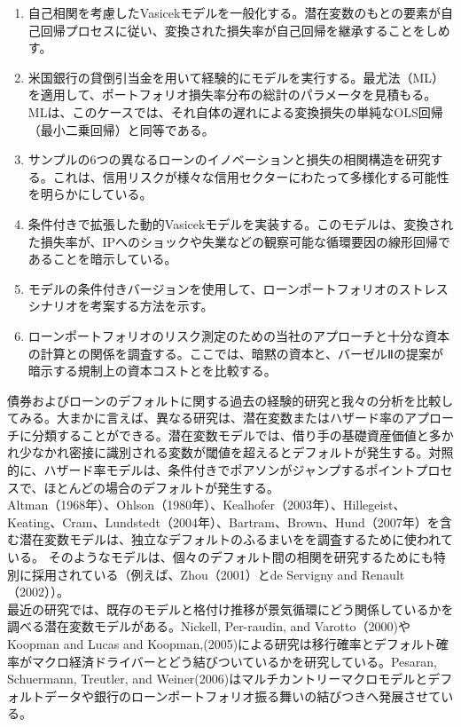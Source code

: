 \documentclass[a4j,12pt]{jarticle}
\begin{document}
\begin{enumerate}
\item 自己相関を考慮したVasicekモデルを一般化する。潜在変数のもとの要素が自己回帰プロセスに従い、変換された損失率が自己回帰を継承することをしめす。
\item 米国銀行の貸倒引当金を用いて経験的にモデルを実行する。最尤法（ML）を適用して、ポートフォリオ損失率分布の総計のパラメータを見積もる。MLは、このケースでは、それ自体の遅れによる変換損失の単純なOLS回帰（最小二乗回帰）と同等である。
\item サンプルの6つの異なるローンのイノベーションと損失の相関構造を研究する。これは、信用リスクが様々な信用セクターにわたって多様化する可能性を明らかにしている。
\item 条件付きで拡張した動的Vasicekモデルを実装する。このモデルは、変換された損失率が、IPへのショックや失業などの観察可能な循環要因の線形回帰であることを暗示している。
\item モデルの条件付きバージョンを使用して、ローンポートフォリオのストレスシナリオを考案する方法を示す。
\item ローンポートフォリオのリスク測定のための当社のアプローチと十分な資本の計算との関係を調査する。ここでは、暗黙の資本と、バーゼルⅡの提案が暗示する規制上の資本コストとを比較する。
\end{enumerate}
債券およびローンのデフォルトに関する過去の経験的研究と我々の分析を比較してみる。大まかに言えば、異なる研究は、潜在変数またはハザード率のアプローチに分類することができる。潜在変数モデルでは、借り手の基礎資産価値と多かれ少なかれ密接に識別される変数が閾値を超えるとデフォルトが発生する。対照的に、ハザード率モデルは、条件付きでポアソンがジャンプするポイントプロセスで、ほとんどの場合のデフォルトが発生する。\\
\indent Altman（1968年）、Ohlson（1980年）、Kealhofer（2003年）、Hillegeist、Keating、Cram、Lundstedt（2004年）、Bartram、Brown、Hund（2007年）を含む潜在変数モデルは、独立なデフォルトのふるまいをを調査するために使われている。 そのようなモデルは、個々のデフォルト間の相関を研究するためにも特別に採用されている（例えば、Zhou（2001）とde Servigny and Renault（2002））。\\
\indent 最近の研究では、既存のモデルと格付け推移が景気循環にどう関係しているかを調べる潜在変数モデルがある。Nickell, Per-raudin, and Varotto（2000)やKoopman and Lucas and Koopman,(2005)による研究は移行確率とデフォルト確率がマクロ経済ドライバーとどう結びついているかを研究している。Pesaran, Schuermann, Treutler, and Weiner(2006)はマルチカントリーマクロモデルとデフォルトデータや銀行のローンポートフォリオ振る舞いの結びつきへ発展させている。\\
\end{document}

